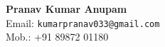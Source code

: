 \documentclass[12pt,a4paper]{article}
\begin{document}
{\LARGE\bf{Pranav Kumar Anupam}}\\
Email: \texttt{\large kumarpranav033@gmail.com}\\
	Mob.: +91 89872 01180\\

\hline 
\end{document}
